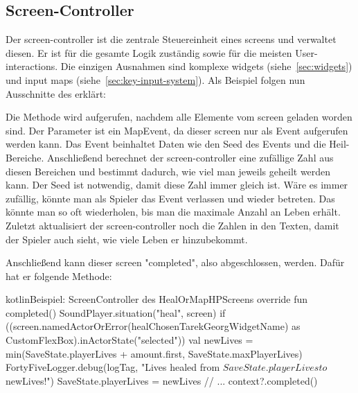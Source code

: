 \renewcommand{\kapitelautor}{Autor: Felix Zwickelstorfer}
\subsection{Screen-Controller}\label{subsec:screen-controller}
\renewcommand{\kapitelautor}{Autor: Felix Zwickelstorfer}

Der screen-controller ist die zentrale Steuereinheit eines screens und verwaltet diesen.
Er ist für die gesamte Logik zuständig sowie für die meisten User-interactions.
Die einzigen Ausnahmen sind komplexe widgets (siehe~\ref{sec:widgets}) und input maps (siehe~\ref{sec:key-input-system}).
Als Beispiel folgen nun Ausschnitte des  erklärt:



Die  Methode wird aufgerufen, nachdem alle Elemente vom screen geladen worden sind.
Der Parameter  ist ein MapEvent, da dieser screen nur als Event aufgerufen werden kann.
Das Event beinhaltet Daten wie den Seed des Events und die Heil-Bereiche.
Anschließend berechnet der screen-controller eine zufällige Zahl aus diesen Bereichen und bestimmt dadurch, wie viel man jeweils geheilt werden kann.
Der Seed ist notwendig, damit diese Zahl immer gleich ist.
Wäre es immer zufällig, könnte man als Spieler das Event verlassen und wieder betreten.
Das könnte man so oft wiederholen, bis man die maximale Anzahl an Leben erhält.
Zuletzt aktualisiert der screen-controller noch die Zahlen in den Texten, damit der Spieler auch sieht, wie viele Leben er hinzubekommt.

Anschließend kann dieser screen "completed", also abgeschlossen, werden.
Dafür hat er folgende Methode:
\begin{codeBlock}{kotlin}{Beispiel: Screen\-Controller des HealOrMapHP\-Screens}
    override fun completed() {
        SoundPlayer.situation("heal", screen)
        if ((screen.namedActorOrError(healChosenTarekGeorgWidgetName) as CustomFlexBox).inActorState("selected")) {
            val newLives = min(SaveState.playerLives + amount.first, SaveState.maxPlayerLives)
            FortyFiveLogger.debug(logTag, "Lives healed from ${SaveState.playerLives} to $newLives!")
            SaveState.playerLives = newLives
        }
        // ...
        context?.completed()
    }
\end{codeBlock}

